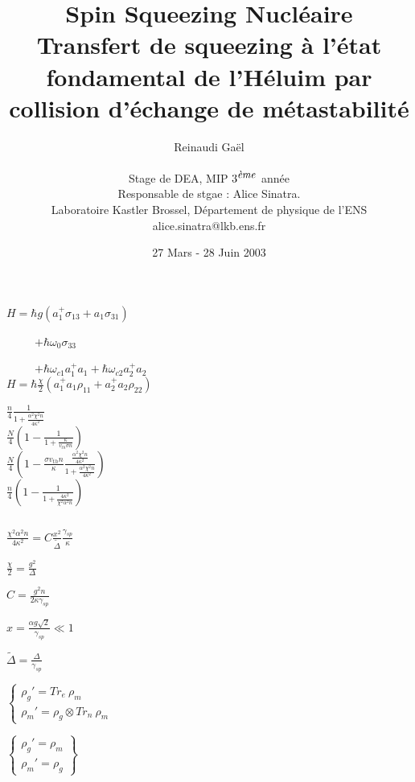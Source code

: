 \documentclass[a4paper,10pt]{report}
\title{\LARGE
         \textbf{Spin Squeezing Nucl\'{e}aire}\\
         \vspace{1.5cm}
         \textbf{Transfert de squeezing \`{a} l'\'{e}tat fondamental de l'H\'{e}luim
         par collision d'\'{e}change de m\'{e}tastabilit\'{e} }\\
         \vspace{1.5cm}
}
\author{ \Huge  Reinaudi Ga\"{e}l\\
           \\
           \LARGE           \vspace{0.7cm}
           Stage de DEA, MIP $3^{\mbox{\small{\textit{\`{e}me}}}}$ ann\'{e}e\\
           \vspace{0.2cm}
           Responsable de stgae : Alice Sinatra.\\
           \vspace{0.2cm}
           Laboratoire Kastler Brossel, D\'{e}partement de physique de l'ENS\\
           \vspace{0.2cm}
           alice.sinatra@lkb.ens.fr
         }
\date{\LARGE 27 Mars - 28 Juin 2003}
\begin{document}
\maketitle




\newpage

\begin{huge}
$H= \hbar  g  (a^{+}_{1}   \sigma_{13} + a_{1}   \sigma_{31})$


\ \ \ \ \  $     +   \hbar \omega_{0} \sigma_{33} $

\ \ \ \ \  $+   \hbar \omega_{c1} a_{1}^{+}a_{1}
        +   \hbar \omega_{c2} a_{2}^{+}a_{2}$
\\

$H=\hbar \frac{\chi}{2} (a^{+}_1 a_1   \rho_{11} + a^{+}_2 a_2 \rho_{22})$


$\frac{n}{4} \frac{1}{ 1 +  \frac{\alpha^2  \chi^2  n}{4 \kappa^2} } $\\

$\frac{N}{4} (1- \frac{1}{ 1 +  \frac{\kappa}{v_{th} \sigma n} } )$\\

$\frac{N}{4} (1- \frac{\sigma v_{th} n}{\kappa} \frac{\frac{\alpha^2  \chi^2  n}{4 \kappa^2} }{ 1 +  \frac{\alpha^2  \chi^2  n}{4 \kappa^2} } )$\\

$\frac{n}{4} \left( 1- \frac{1}{1+ \frac{4 \kappa^2}{\chi^2 \alpha^2
n}}\right)$

$\ $

$\frac{\chi^2 \alpha^2 n}{4 \kappa^2} = C \frac{x^2}{\tilde{\Delta}}
\frac{\gamma_{sp}}{\kappa}$


$\frac{\chi}{2}=\frac{g^2}{\Delta}$

$C=\frac{g^2 n}{2 \kappa \gamma_{sp}}$

$x=\frac{\alpha g \sqrt{2}}{\gamma_{sp}} \ll 1$

$\tilde{\Delta}=\frac{\Delta}{\gamma_{sp}}$

$
\left \{
\begin{array}{l}

\rho_{g}' = Tr_{e}\ \rho_{m}\\

\rho_{m}' = \rho_{g} \otimes Tr_{n}\ \rho_{m}
\end{array}
\right.
$

$ \left \{
\begin{array}{l}

\rho_{g}' = \rho_{m}\\

\rho_{m}' = \rho_{g}
\end{array}
\right \} $
\\

\end{huge}
\end{document}
